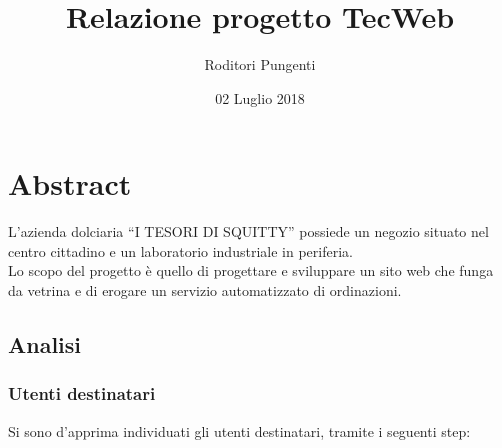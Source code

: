 



\title{\textbf{Relazione progetto TecWeb}}
\author{Roditori Pungenti}

\date{02 Luglio 2018}




\makeFrontPage

\tableofcontents

\newpage

\section{Abstract}

L’azienda dolciaria “I TESORI DI SQUITTY” possiede un negozio situato nel centro cittadino e un laboratorio industriale in periferia.\\
Lo scopo del progetto è quello di progettare e sviluppare un sito web che funga da vetrina e di erogare un servizio automatizzato di ordinazioni.\\


\subsection{Analisi}

\subsubsection{Utenti destinatari}

Si sono d'apprima individuati gli utenti destinatari, tramite i seguenti step:

